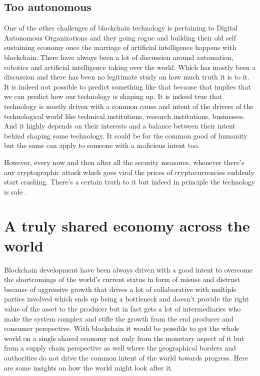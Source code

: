 \subsection{Too autonomous}

One of the other challenges of blockchain technology is pertaining to Digital Autonomous Organizations and they going rogue and building their old self sustaining economy once the marriage of artificial intelligence happens with blockchain. There have always been a lot of discussion around automation, robotics and artificial intelligence taking over the world. Which has mostly been a discussion and there has been no legitimate study on how much truth it is to it. It is indeed not possible to predict something like that because that implies that we can predict how our technology is shaping up. It is indeed true that technology is mostly driven with a common cause and intent of the drivers of the technological world like technical institutions, research institutions, businesses. And it highly depends on their interests and a balance between their intent behind shaping some technology. It could be for the common good of humanity but the same can apply to someone with a malicious intent too.


However, every now and then after all the security measures, whenever there's any cryptographic attack which goes viral the prices of cryptocurrencies suddenly start crashing. There's a certain truth to it but indeed in principle the technology is safe \cite{david36}.

\section{A truly shared economy across the world}
Blockchain development have been always driven with a good intent to overcome the shortcomings of the world's current status in form of misuse and distrust because of aggressive growth that drives a lot of collaborative with multiple parties involved which ends up being a bottleneck and doesn't provide the right value of the asset to the producer but in fact gets a lot of intermediaries who make the system complex and stifle the growth from the end producer and consumer perspective. With blockchain it would be possible to get the whole world on a single shared economy not only from the monetary aspect of it but from a supply chain perspective as well where the geographical borders and authorities do not drive the common intent of the world towards progress. Here are some insights on how the world might look after it.

